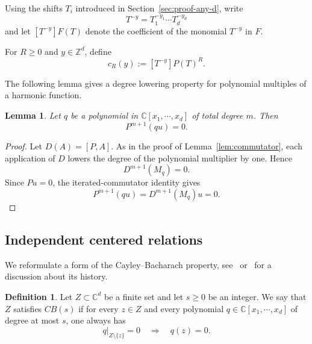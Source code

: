 \documentclass[11pt,reqno]{amsart}
\newcommand\Z{\ensuremath{\mathbb{Z}}}
\newcommand\C{\ensuremath{\mathbb{C}}}
\newtheorem{lemma}[theorem]{Lemma}
\theoremstyle{definition}
\newtheorem{definition}[theorem]{Definition}
\theoremstyle{plain}
\numberwithin{equation}{section}
\begin{document}
Using the shifts $T_i$ introduced in Section~\ref{sec:proof-any-d}, write
\begin{equation*}
    T^{-y}= T_1^{-y_1}\cdots T_d^{-y_d}
\end{equation*}
and let $[T^{-y}]F(T)$ denote the coefficient of the monomial $T^{-y}$ in $F$.

For $R\ge 0$ and $y\in \Z^d$, define
\begin{equation}\label{eqn:coefficient-notation}
    c_R(y):=[T^{-y}]P(T)^R.
\end{equation}

The following lemma gives a degree lowering property for polynomial multiples of a harmonic function.

\begin{lemma}\label{lem:lower}
    Let $q$ be a polynomial in $\C[x_1,\cdots,x_d]$ of total degree $m$. Then
    \begin{equation*}
        P^{m+1}(qu)=0.
    \end{equation*}
\end{lemma}
\begin{proof}
Let $D(A)=[P,A]$. As in the proof of
Lemma~\ref{lem:commutator}, each application of $D$ lowers the degree
of the polynomial multiplier by one. Hence
\begin{equation*}
    D^{m+1}(M_q)=0.
\end{equation*}
Since $Pu=0$, the iterated-commutator identity gives
\begin{equation*}
    P^{m+1}(qu)=D^{m+1}(M_q)u=0.
\end{equation*}
\end{proof}


\subsection{Independent centered relations}
We reformulate a form of the Cayley--Bacharach property, see~\cite[Definition~2.1]{GKR} or~\cite[\S~1.2]{EGH} for a discussion about its history.
\begin{definition}
    Let $Z\subset \C^d$ be a finite set and let $s\ge 0$ be an integer. We say that $Z$ satisfies $CB(s)$ if for every $z\in Z$ and every polynomial $q\in \C[x_1,\cdots,x_d]$ of degree at most $s$, one always has
    \begin{equation*}
         q|_{Z\setminus\{z\}}=0 \quad\Longrightarrow\quad q(z)=0.
    \end{equation*}
\end{definition}
\end{document}
